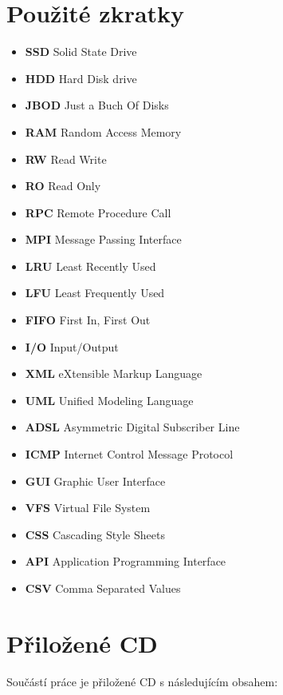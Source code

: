 \documentclass[czech,DP]{thesiskiv}
\begin{document}
\appendix

\chapter{Použité zkratky}

\begin{itemize}
\item \textbf{SSD} Solid State Drive
\item \textbf{HDD} Hard Disk drive
\item \textbf{JBOD} Just a Buch Of Disks
\item \textbf{RAM} Random Access Memory
\item \textbf{RW} Read Write
\item \textbf{RO} Read Only
\item \textbf{RPC} Remote Procedure Call
\item \textbf{MPI} Message Passing Interface
\item \textbf{LRU} Least Recently Used
\item \textbf{LFU} Least Frequently Used
\item \textbf{FIFO} First In, First Out
\item \textbf{I/O} Input/Output
\item \textbf{XML} eXtensible Markup Language
\item \textbf{UML} Unified Modeling Language
\item \textbf{ADSL} Asymmetric Digital Subscriber Line
\item \textbf{ICMP} Internet Control Message Protocol
\item \textbf{GUI} Graphic User Interface
\item \textbf{VFS} Virtual File System
\item \textbf{CSS} Cascading Style Sheets
\item \textbf{API} Application Programming Interface
\item \textbf{CSV} Comma Separated Values
\end{itemize}

\chapter{Přiložené CD}

Součástí práce je přiložené CD s následujícím obsahem:
\end{document}
